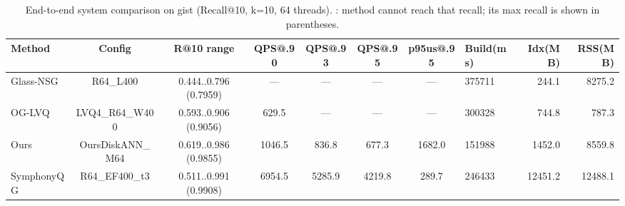 \begin{table}[t]
\centering
\small
\caption{End-to-end system comparison on gist (Recall@10, k=10, 64 threads). \textemdash{}: method cannot reach that recall; its max recall is shown in parentheses.}
\label{tab:system_fair}
\begin{tabular}{lcccccclrr}
\toprule
Method & Config & R@10 range & QPS@.90 & QPS@.93 & QPS@.95 & p95us@.95 & Build(ms) & Idx(MB) & RSS(MB) \\
\midrule
Glass-NSG & R64_L400 & 0.444..0.796 (0.7959) & — & — & — & — & 375711 & 244.1 & 8275.2 \\
OG-LVQ & LVQ4_R64_W400 & 0.593..0.906 (0.9056) & 629.5 & — & — & — & 300328 & 744.8 & 787.3 \\
Ours & OursDiskANN_M64 & 0.619..0.986 (0.9855) & 1046.5 & 836.8 & 677.3 & 1682.0 & 151988 & 1452.0 & 8559.8 \\
SymphonyQG & R64_EF400_t3 & 0.511..0.991 (0.9908) & 6954.5 & 5285.9 & 4219.8 & 289.7 & 246433 & 12451.2 & 12488.1 \\
\bottomrule
\end{tabular}
\end{table}


